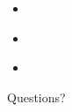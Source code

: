 \documentclass[t]{beamer}
\begin{document}
\begin{frame}{}
  \begin{itemize}
  \item 
  \end{itemize}
  \note{}
\end{frame}

\begin{frame}{}
  \begin{itemize}
  \item 
  \end{itemize}
  \note{}
\end{frame}

\begin{frame}{}
  \begin{itemize}
  \item 
  \end{itemize}
  \note{}
\end{frame}

\begin{frame}{Questions?}
  \note{}
\end{frame}
\end{document}
